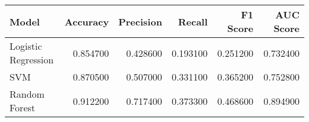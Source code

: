 \begin{tabular}{lrrrrr}
\toprule
Model & Accuracy & Precision & Recall & F1 Score & AUC Score \\
\midrule
Logistic Regression & 0.854700 & 0.428600 & 0.193100 & 0.251200 & 0.732400 \\
SVM & 0.870500 & 0.507000 & 0.331100 & 0.365200 & 0.752800 \\
Random Forest & 0.912200 & 0.717400 & 0.373300 & 0.468600 & 0.894900 \\
\bottomrule
\end{tabular}
